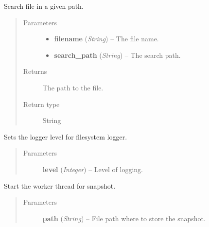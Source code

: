 \documentclass[letterpaper,10pt,english]{sphinxmanual}
\begin{document}

\begin{fulllineitems}
\label{filesystem:filesystem.search_file}
Search file in a given path.
\begin{quote}\begin{description}
\item[{Parameters}] \leavevmode\begin{itemize}
\item {} 
\textbf{filename} (\emph{String}) -- The file name.

\item {} 
\textbf{search\_path} (\emph{String}) -- The search path.

\end{itemize}

\item[{Returns}] \leavevmode
The path to the file.

\item[{Return type}] \leavevmode
String

\end{description}\end{quote}

\end{fulllineitems}


\begin{fulllineitems}
\label{filesystem:filesystem.set_logger_level}
Sets the logger level for filesystem logger.
\begin{quote}\begin{description}
\item[{Parameters}] \leavevmode
\textbf{level} (\emph{Integer}) -- Level of logging.

\end{description}\end{quote}

\end{fulllineitems}


\begin{fulllineitems}
\label{filesystem:filesystem.snapshot}
Start the worker thread for snapshot.
\begin{quote}\begin{description}
\item[{Parameters}] \leavevmode
\textbf{path} (\emph{String}) -- File path where to store the snapshot.

\end{description}\end{quote}

\end{fulllineitems}
\end{document}
